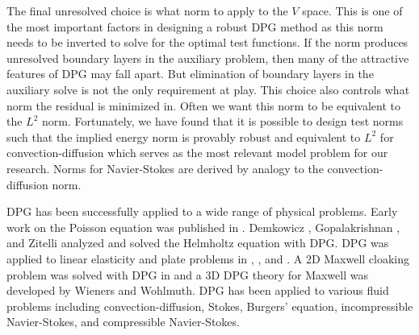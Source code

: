 \documentclass[Dissertation.tex]{subfiles}
\begin{document}
The final unresolved choice is what norm to apply to the $V$ space.
This is one of the most important factors in designing a robust DPG method as this norm needs to be inverted to solve for the optimal test functions.
If the norm produces unresolved boundary layers in the auxiliary problem, then many of the attractive features of DPG may fall apart.
But elimination of boundary layers in the auxiliary solve is not the only requirement at play.
This choice also controls what norm the residual is minimized in.
Often we want this norm to be equivalent to the $L^2$ norm.
Fortunately, we have found that it is possible to design test norms such that the implied energy norm
is provably robust and equivalent to $L^2$ for convection-diffusion which
serves as the most relevant model problem for our research.
Norms for Navier-Stokes are derived by analogy to the convection-diffusion norm.

DPG has been successfully applied to a wide range of physical problems.
Early work on the Poisson equation was published in \cite{DPGPoisson}.
Demkowicz \etal\cite{DPGHelmholtz}, Gopalakrishnan \etal\cite{Gopalakrishnan2014}, and Zitelli \etal\cite{DPG4}
analyzed and solved the Helmholtz equation with DPG.
DPG was applied to linear elasticity and plate problems in \cite{BramwellDPG}, \cite{NiemiBramwellDemkowicz10}, and \cite{BramwellDemkowiczQiu10}.
A 2D Maxwell cloaking problem was solved with DPG in \cite{DPGCloaking}
and a 3D DPG theory for Maxwell was developed by Wieners and Wohlmuth\cite{WohlmuthReport}.
DPG has been applied to various fluid problems including convection-diffusion\cite{DPG3,DemkowiczHeuer,ChanHeuerThanhDemkowicz2012,Chan2013,Ellis2013Report},
Stokes\cite{DPGStokes,Ellis2013Report}, Burgers' equation\cite{Chan2013dpg}, incompressible Navier-Stokes\cite{NateDissertation},
and compressible Navier-Stokes\cite{JesseDissertation}.

\end{document}
